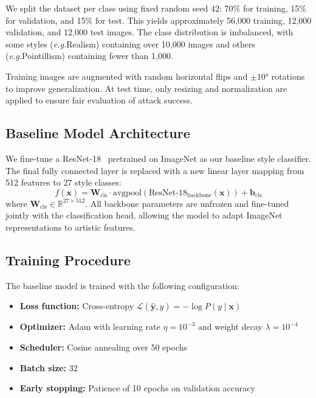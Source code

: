 \documentclass[conference]{IEEEtran}
\newcommand{\W}{\mathbf{W}}
\newcommand{\bias}{\mathbf{b}}
\newcommand{\x}{\mathbf{x}}
\newcommand{\yhat}{\hat{\mathbf{y}}}
\newcommand{\loss}{\mathcal{L}}
\newcommand{\R}{\mathbb{R}}
\newcommand{\condprob}[2]{P\left(#1 \mid #2\right)}
\newcommand{\eg}{\textit{e.g.}}
\begin{document}
We split the dataset per class using fixed random seed 42: 70\% for training, 15\% for validation, and 15\% for test. This yields approximately 56,000 training, 12,000 validation, and 12,000 test images. The class distribution is imbalanced, with some styles (\eg Realism) containing over 10,000 images and others (\eg Pointillism) containing fewer than 1,000.

Training images are augmented with random horizontal flips and $\pm 10°$ rotations to improve generalization. At test time, only resizing and normalization are applied to ensure fair evaluation of attack success.

\subsection{Baseline Model Architecture}

We fine-tune a ResNet-18~\cite{he2016resnet} pretrained on ImageNet as our baseline style classifier. The final fully connected layer is replaced with a new linear layer mapping from 512 features to 27 style classes:
\begin{equation}
    f(\x) = \W_{\text{cls}} \cdot \text{avgpool}(\text{ResNet-18}_{\text{backbone}}(\x)) + \bias_{\text{cls}}
\end{equation}
where $\W_{\text{cls}} \in \R^{27 \times 512}$. All backbone parameters are unfrozen and fine-tuned jointly with the classification head, allowing the model to adapt ImageNet representations to artistic features.

\subsection{Training Procedure}

The baseline model is trained with the following configuration:

\begin{itemize}
    \item \textbf{Loss function:} Cross-entropy $\loss(\yhat, y) = -\log \condprob{y}{\x}$
    \item \textbf{Optimizer:} Adam with learning rate $\eta = 10^{-3}$ and weight decay $\lambda = 10^{-4}$
    \item \textbf{Scheduler:} Cosine annealing over 50 epochs
    \item \textbf{Batch size:} 32
    \item \textbf{Early stopping:} Patience of 10 epochs on validation accuracy
\end{itemize}
\end{document}
